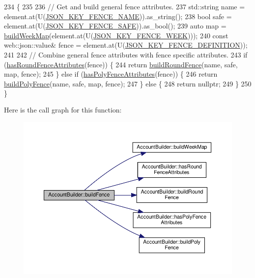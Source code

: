 \begin{DoxyCode}
234 \{
235 
236     \textcolor{comment}{// Get and build general fence attributes.}
237     std::string name = element.at(U(\hyperlink{_fence_8h_a0bf10e901f60610c8a47c143051deea4}{JSON\_KEY\_FENCE\_NAME})).as\_string();
238     \textcolor{keywordtype}{bool} safe = element.at(U(\hyperlink{_fence_8h_a4b2bc1fec134d7881cd286c8b6741752}{JSON\_KEY\_FENCE\_SAFE})).as\_bool();
239     \textcolor{keyword}{auto} map = \hyperlink{class_account_builder_a19b2e3e2c3bbf986f51c0ec53b7dc2a4}{buildWeekMap}(element.at(U(\hyperlink{_fence_8h_a94c5efe13ae824c55eebaa9e8a76dd57}{JSON\_KEY\_FENCE\_WEEK})));
240     \textcolor{keyword}{const} web::json::value& fence = element.at(U(\hyperlink{_fence_8h_a698e69a18d481c1033ae9f7d6fb2e5b6}{JSON\_KEY\_FENCE\_DEFINITION}));
241 
242     \textcolor{comment}{// Combine general fence attributes with fence specific attributes.}
243     \textcolor{keywordflow}{if} (\hyperlink{class_account_builder_aea9045a135dac995cbf409b61c5850bf}{hasRoundFenceAttributes}(fence)) \{
244         \textcolor{keywordflow}{return} \hyperlink{class_account_builder_a0223a0830ba9a0e707c5a2bd5d74ee50}{buildRoundFence}(name, safe, map, fence);
245     \} \textcolor{keywordflow}{else} \textcolor{keywordflow}{if} (\hyperlink{class_account_builder_a426cb519ae4c5f0594f0f1e41e9f5a73}{hasPolyFenceAttributes}(fence)) \{
246         \textcolor{keywordflow}{return} \hyperlink{class_account_builder_a9a93946d8ba8908f6bcfa6b793cc6277}{buildPolyFence}(name, safe, map, fence);
247     \} \textcolor{keywordflow}{else} \{
248         \textcolor{keywordflow}{return} \textcolor{keyword}{nullptr};
249     \}
250 \}
\end{DoxyCode}
Here is the call graph for this function\+:\nopagebreak
\begin{figure}[H]
\begin{center}
\leavevmode
\includegraphics[width=350pt]{d9/daa/class_account_builder_ac5801a1130d7a1f84a66c45cfd6e0a8d_cgraph}
\end{center}
\end{figure}

